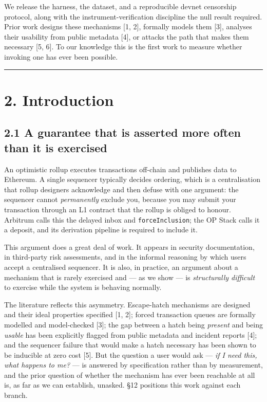 \documentclass[conference]{IEEEtran}
\renewcommand{\_}{\textunderscore\allowbreak}
\begin{document}
We release the harness, the dataset, and a reproducible devnet
censorship protocol, along with the instrument-verification discipline
the null result required. Prior work designs these mechanisms {[}1,
2{]}, formally models them {[}3{]}, analyses their usability from public
metadata {[}4{]}, or attacks the path that makes them necessary {[}5,
6{]}. To our knowledge this is the first work to measure whether
invoking one has ever been possible.

\begin{center}\rule{0.5\linewidth}{0.5pt}\end{center}

\section{2. Introduction}\label{introduction}

\subsection{2.1 A guarantee that is asserted more often than it is
exercised}\label{a-guarantee-that-is-asserted-more-often-than-it-is-exercised}

An optimistic rollup executes transactions off-chain and publishes data
to Ethereum. A single sequencer typically decides ordering, which is a
centralisation that rollup designers acknowledge and then defuse with
one argument: the sequencer cannot \emph{permanently} exclude you,
because you may submit your transaction through an L1 contract that the
rollup is obliged to honour. Arbitrum calls this the delayed inbox and
\texttt{forceInclusion}; the OP Stack calls it a deposit, and its
derivation pipeline is required to include it.

This argument does a great deal of work. It appears in security
documentation, in third-party risk assessments, and in the informal
reasoning by which users accept a centralised sequencer. It is also, in
practice, an argument about a mechanism that is rarely exercised and ---
as we show --- is \emph{structurally difficult} to exercise while the
system is behaving normally.

The literature reflects this asymmetry. Escape-hatch mechanisms are
designed and their ideal properties specified {[}1, 2{]}; forced
transaction queues are formally modelled and model-checked {[}3{]}; the
gap between a hatch being \emph{present} and being \emph{usable} has
been explicitly flagged from public metadata and incident reports
{[}4{]}; and the sequencer failure that would make a hatch necessary has
been shown to be inducible at zero cost {[}5{]}. But the question a user
would ask --- \emph{if I need this, what happens to me?} --- is answered
by specification rather than by measurement, and the prior question of
whether the mechanism has ever been reachable at all is, as far as we
can establish, unasked. §12 positions this work against each branch.
\end{document}
